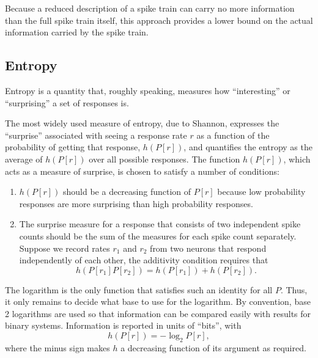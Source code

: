 \begin{rem}
  Because a reduced description of a spike train can carry no more information than the full spike train itself, this approach provides a lower bound on the actual information carried by the spike train.
\end{rem}


\subsection{Entropy}
\label{sec:entropy}

\begin{fac}
  Entropy is a quantity that, roughly speaking, measures how ``interesting'' or ``surprising'' a set of responses is.
\end{fac}

\begin{exm}
  The most widely used measure of entropy, due to Shannon, expresses the ``surprise'' associated with seeing a response rate $r$ as a function of the probability of getting that response, $h(P[r])$, and quantifies the
  entropy as the average of $h(P[r])$ over all possible responses. The function
  $h(P[r])$, which acts as a measure of surprise, is chosen to satisfy a number of conditions:
  \begin{enumerate}[(1)]
  \item  $h(P[r])$ should be a decreasing function of $P[r]$
    because low probability responses are more surprising than high probability responses.
  \item The surprise measure for a response that consists of two independent spike counts should be the sum of the measures for each spike count separately. Suppose we record rates $r_1$ and $r_2$ from two neurons that respond independently of each other, the additivity condition requires that
    \begin{equation}
      \label{equ:4.1}
      h(P[r_1]P[r_2])=h(P[r_1])+h(P[r_2]).
    \end{equation}
  \end{enumerate}
  The logarithm is the only function that satisfies such an identity for all $P$.
  Thus, it only remains to decide what base to use for the logarithm. By convention, base 2 logarithms are used so that information can be compared easily with results for binary systems. Information is reported in units of ``bits'', with
  \begin{equation}
    \label{equ:4.2}
    h(P[r])=-\log_2P[r],
  \end{equation}
  where the minus sign makes $h$ a decreasing function of its argument as required.
\end{exm}

